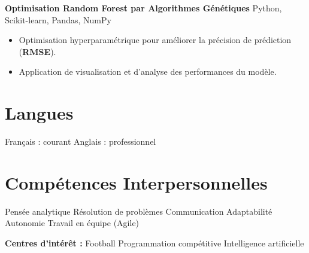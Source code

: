 \documentclass[10pt,a4paper]{article}
\begin{document}
\textbf{Optimisation Random Forest par Algorithmes Génétiques}
\hfill Python, Scikit-learn, Pandas, NumPy

\begin{itemize}
  \item Optimisation hyperparamétrique pour améliorer la précision de prédiction (\textbf{RMSE}).
  \item Application de visualisation et d'analyse des performances du modèle.
\end{itemize}

\section*{Langues}

Français : courant \textbar{} Anglais : professionnel

\section*{Compétences Interpersonnelles}

Pensée analytique \textbar{} Résolution de problèmes \textbar{} Communication \textbar{}
Adaptabilité \textbar{} Autonomie \textbar{} Travail en équipe (Agile)

\vspace{2pt}
\textbf{Centres d'intérêt :} Football \textbar{} Programmation compétitive \textbar{} Intelligence artificielle
\end{document}
